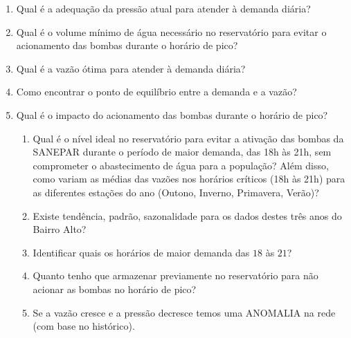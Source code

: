 \begin{enumerate}[start=1, label={\textbf{Q} \arabic*}]
	\item \label{q1} Qual é a adequação da pressão atual para atender à demanda diária?
	\item \label{q2} Qual é o volume mínimo de água necessário no reservatório para evitar o acionamento das bombas durante o horário de pico? 
	\item \label{q3} Qual é a vazão ótima para atender à demanda diária?
	\item \label{q4} Como encontrar o ponto de equilíbrio entre a demanda e a vazão?
	\item \label{q5} Qual é o impacto do acionamento das bombas durante o horário de pico?
	 
	\begin{enumerate}[label=\alph*.]
	\item \label{q5:a} Qual é o nível ideal no reservatório para evitar a ativação das bombas da SANEPAR durante o período de maior demanda, das 18h às 21h, sem comprometer o abastecimento de água para a população? Além disso, como variam as médias das vazões nos horários críticos (18h às 21h) para as diferentes estações do ano (Outono, Inverno, Primavera, Verão)? 
	\item \label{q5:b} Existe tendência, padrão, sazonalidade para os dados destes três anos do Bairro Alto?
	\item \label{q5:c} Identificar quais os horários de maior demanda das $18$ às $21$?
	\item \label{q5:d} Quanto tenho que armazenar previamente no reservatório para não acionar as bombas no horário de pico?
	\item \label{q5:e} Se a vazão cresce e a pressão decresce temos uma ANOMALIA na rede (com base no histórico).	
	\end{enumerate}
\end{enumerate}
